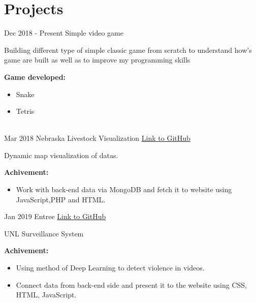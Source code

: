 \documentclass[letterpaper]{twentysecondcv} %
\begin{document}
\section{Projects}
\begin{twenty}
	\twentyitem
    	{Dec 2018 - }
		{Present}
        {Simple video game}
        {} %
        {}
        {
       	Building different type of simple classic game from scratch to understand how's game are built as well as to improve my programming skills
       	
       	\textbf{Game developed:}
        {\begin{itemize}
        \item Snake
        \item Tetris
		\end{itemize}}
        }
    \\
    \twentyitem
    	{Mar 2018}
		{}
        {Nebraska Livestock Visualization}
        {\href{https://github.com/HuyNVuong/Nebraska-livestock-Visualisation}{Link to GitHub}} %
        {}
        {
       	Dynamic map visualization of datas.
       	
       	\textbf{Achivement:}
        {\begin{itemize}
        \item Work with back-end data via MongoDB and fetch it to website using JavaScript,PHP and HTML.
		\end{itemize}}
        }
    \twentyitem
    	{Jan 2019}
		{}
        {Entree}
        {\href{https://datduyng.github.io/cornhack2019/}{Link to GitHub}} %
        {}
        {
       	UNL Surveillance System
       	
       	\textbf{Achivement:}
        {\begin{itemize}
        \item Using method of Deep Learning to detect violence in videos.
        \item Connect data from back-end side and present it to the website using CSS, HTML, JavaScript.
		\end{itemize}}
        }
\end{twenty}
\end{document}
